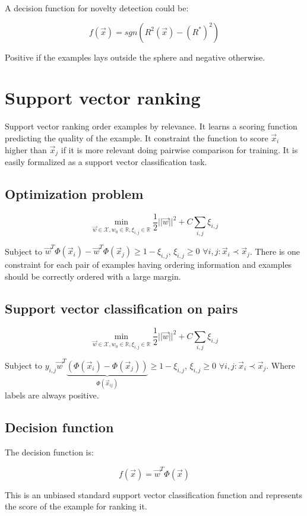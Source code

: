 	A decision function for novelty detection could be:

	$$f(\vec{x}) = sgn(R^2(\vec{x})-(R^*)^2)$$

	Positive if the examples lays outside the sphere and negative otherwise.

\section{Support vector ranking}
Support vector ranking order examples by relevance.
It learns a scoring function predicting the quality of the example.
It constraint the function to score $\vec{x}_i$ higher than $\vec{x}_j$ if it is more relevant doing pairwise comparison for training.
It is easily formalized as a support vector classification task.

	\subsection{Optimization problem}

	$$\min\limits_{\vec{w}\in\mathcal{X}, w_0\in\mathbb{R},\xi_{i,j}\in\mathbb{R}}\frac{1}{2}||\vec{w}||^2+C\sum\limits_{i,j}\xi_{i,j}$$

	Subject to $\vec{w}^T\Phi(\vec{x}_i)-\vec{w}^T\Phi(\vec{x}_j) \ge 1 - \xi_{i,j}$, $\xi_{i,j}\ge 0$ $\forall i,j:\vec{x}_i\prec\vec{x}_j$.
	There is one constraint for each pair of examples having ordering information and examples should be correctly ordered with a large margin.

	\subsection{Support vector classification on pairs}

	$$\min\limits_{\vec{w}\in\mathcal{X}, w_0\in\mathbb{R},\xi_{i,j}\in\mathbb{R}}\frac{1}{2}||\vec{w}||^2+C\sum\limits_{i,j}\xi_{i,j}$$

	Subject to $y_{i,j}\vec{w}^T\underbrace{(\Phi(\vec{x}_i)-\Phi(\vec{x}_j))}_{\Phi(\vec{x}_{ij})} \ge 1 - \xi_{i,j}$, $\xi_{i,j}\ge 0$ $\forall i,j:\vec{x}_i\prec\vec{x}_j$.
	Where labels are always positive.

	\subsection{Decision function}
	The decision function is:

	$$f(\vec{x}) = \vec{w}^T\Phi(\vec{x})$$

	This is an unbiased standard support vector classification function and represents the score of the example for ranking it.
